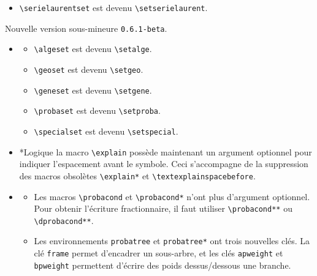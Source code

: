\documentclass[12pt,a4paper]{book}
\makeatletter
\newcommand\env[1]{\texttt{#1}}
\newcommand\macro[1]{\env{\textbackslash{}#1}}
\theoremstyle{definition}
\newcommand\topic{\@ifstar{\@topic@star}{\@topic@no@star}}
\newcommand\@topic@no@star[1]{%
	\textbf{\textsc{#1}.}%
}
\newcommand\@topic@star[1]{%
	\textbf{\textsc{#1} :}%
}
\makeatother
\begin{document}
{{\begin{description}
\begin{itemize}[itemsep=.5em]
\begin{itemize}[itemsep=.5em]
            \item \macro{serielaurentset} est devenu \macro{setserielaurent}.
        \end{itemize}
    \end{itemize}


    \medskip
    \item[2019-10-13] Nouvelle version sous-mineure \verb+0.6.1-beta+.
    
    \begin{itemize}[itemsep=.5em]
        \item \topic{Ensembles}
        \begin{itemize}[itemsep=.5em]
            \item \macro{algeset} est devenu \macro{setalge}.
    
            \item \macro{geoset} est devenu \macro{setgeo}.
    
            \item \macro{geneset} est devenu \macro{setgene}.
    
            \item \macro{probaset} est devenu \macro{setproba}.
    
            \item \macro{specialset} est devenu \macro{setspecial}.
        \end{itemize}
    
    
    
    
        \item \topic*{Logique}
    	      la macro \macro{explain} possède maintenant un argument optionnel pour indiquer l'espacement avant le symbole.
              Ceci s'accompagne de la suppression des macros obsolètes \macro{explain*} et \macro{textexplainspacebefore}.
    
    
    
    
        \item \topic{Probabilité}
        \begin{itemize}[itemsep=.5em]
            \item Les macros \macro{probacond} et \macro{probacond*} n'ont plus d'argument optionnel. Pour obtenir l'écriture fractionnaire, il faut utiliser \macro{probacond**} ou \macro{dprobacond**}.
    
            \item Les environnements \verb+probatree+ et \verb+probatree*+ ont trois nouvelles clés.
                  La clé \verb+frame+ permet d'encadrer un sous-arbre, et les clés \verb+apweight+ et \verb+bpweight+ permettent d'écrire des poids dessus/dessous une branche.
        \end{itemize}
    \end{itemize}


\end{description}}}
\end{document}
